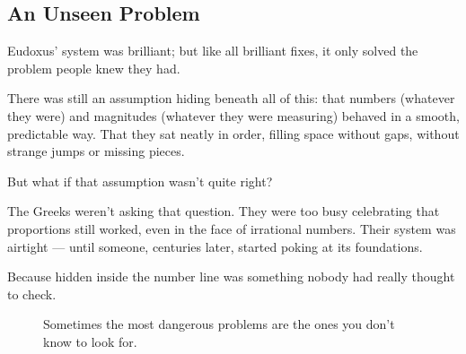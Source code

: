 \subsection{An Unseen Problem}
Eudoxus’ system was brilliant; but like all brilliant fixes, it only solved the problem people knew they had.

There was still an assumption hiding beneath all of this: that numbers (whatever they were) and magnitudes (whatever they were measuring) behaved in a smooth, predictable way. That they sat neatly in order, filling space without gaps, without strange jumps or missing pieces.

But what if that assumption wasn’t quite right?

The Greeks weren’t asking that question. They were too busy celebrating that proportions still worked, even in the face of irrational numbers. Their system was airtight --- until someone, centuries later, started poking at its foundations.

Because hidden inside the number line was something nobody had really thought to check.

\begin{figure}[H]
\centering
{}
\caption{Sometimes the most dangerous problems are the ones you don't know to look for.}
\end{figure}
